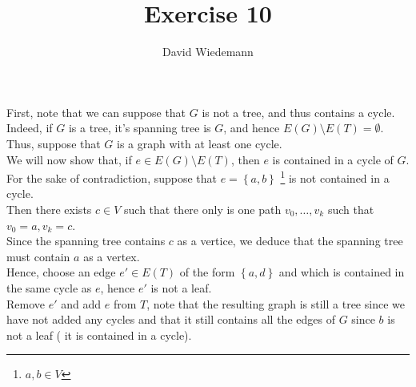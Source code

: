 \documentclass[11pt, a4paper]{article}
\begin{document}
\title{Exercise 10}
\author{David Wiedemann}
\maketitle
First, note that we can suppose that $G$ is not a tree, and thus contains a cycle.\\
Indeed, if $G$ is a tree, it's spanning tree is $G$, and hence $E( G) \setminus E( T) = \emptyset$.\\
Thus, suppose that $G$ is a graph with at least one cycle.\\
We will now show that, if $e \in E( G) \setminus E( T) $, then $e$ is contained in a cycle of $G$.\\
For the sake of contradiction, suppose that $e= \left\{ a,b \right\} $ \footnote { $a,b \in V$}  is not contained in a cycle.\\
Then there exists $c \in V$ such that there only is one path $ v_0, \ldots, v_k$ such that $v_0=a, v_k= c$.\\
Since the spanning tree contains $c$ as a vertice, we deduce that the spanning tree must contain $a$ as a vertex.\\
\hr
Hence, choose an edge $e' \in E( T) $ of the form $ \left\{ a,d \right\} $ and which is contained in the same cycle as $e$, hence $e'$ is not a leaf.\\
Remove $e'$ and add $e$ from $T$, note that the resulting graph is still a tree since we have not added any cycles and that it still contains all the edges of $G$ since $b$ is not a leaf ( it is contained in a cycle).



	
\end{document}
